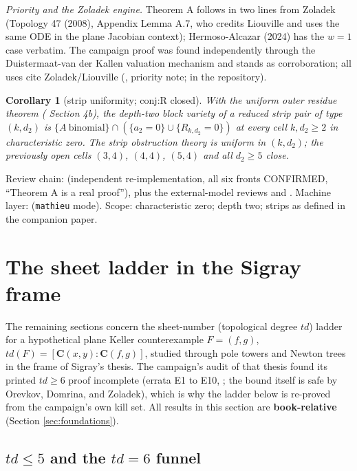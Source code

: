 \documentclass[11pt]{article}
\newtheorem{corollary}[theorem]{Corollary}
\theoremstyle{definition}
\theoremstyle{remark}
\begin{document}
\emph{Priority and the Zoladek engine.} Theorem A follows in two lines from
Zoladek (Topology 47 (2008), Appendix Lemma A.7, who credits Liouville and
uses the same ODE in the plane Jacobian context); Hermoso-Alcazar (2024) has
the $w=1$ case verbatim. The campaign proof was found independently through
the Duistermaat-van der Kallen valuation mechanism and stands as
corroboration; all uses cite Zoladek/Liouville
(, priority note;  in the repository).

\begin{corollary}[strip uniformity; conj:R closed]\label{cor:unif}
With the uniform outer residue theorem ( Section 4b), the
depth-two block variety of a reduced strip pair of type $(k,d_2)$ is
$\{A\ \mathrm{binomial}\}\cap(\{a_2=0\}\cup\{R_{k,d_2}=0\})$ at every cell
$k,d_2\ge 2$ in characteristic zero. The strip obstruction theory is uniform
in $(k,d_2)$; the previously open cells $(3,4)$, $(4,4)$, $(5,4)$ and all
$d_2\ge 5$ close.
\end{corollary}

Review chain:  (independent re-implementation, all six
fronts CONFIRMED, ``Theorem A is a real proof''), plus the external-model
reviews  and
. Machine layer:
 (\texttt{mathieu} mode). Scope: characteristic
zero; depth two; strips as defined in the companion paper.

\section{The sheet ladder in the Sigray frame}\label{sec:ladder}

The remaining sections concern the sheet-number (topological degree $td$)
ladder for a hypothetical plane Keller counterexample $F=(f,g)$,
$td(F)=[\mathbf{C}(x,y):\mathbf{C}(f,g)]$, studied through pole towers and
Newton trees in the frame of Sigray's thesis. The campaign's audit of that
thesis found its printed $td\ge 6$ proof incomplete (errata E1 to E10,
; the bound itself is safe by Orevkov, Domrina, and Zoladek),
which is why the ladder below is re-proved from the campaign's own kill set.
All results in this section are \textbf{book-relative} (Section
\ref{sec:foundations}).

\subsection{$td\le 5$ and the $td=6$ funnel}
\end{document}
